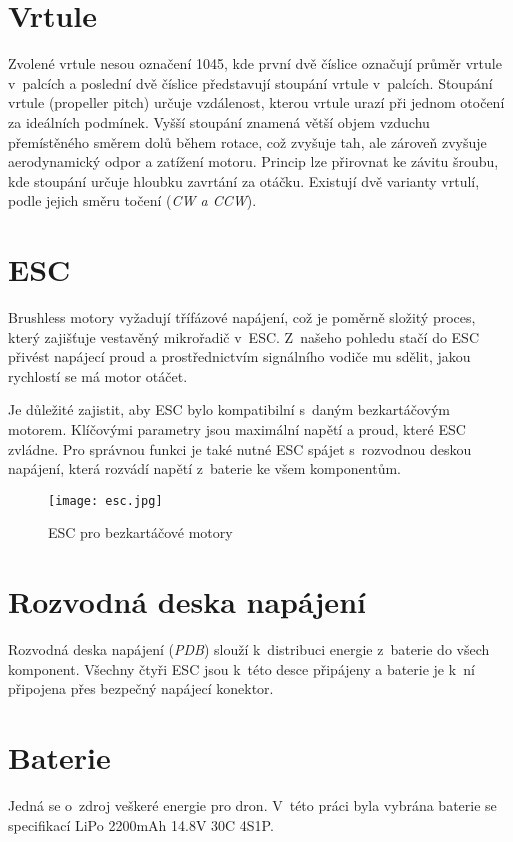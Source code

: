 \documentclass[12pt]{report}
\begin{document}
\section[Vrtule]{Vrtule}
Zvolené vrtule nesou označení 1045, kde první dvě číslice označují průměr vrtule v~palcích a poslední dvě číslice představují stoupání vrtule v~palcích. Stoupání vrtule (propeller pitch) určuje vzdálenost, kterou vrtule urazí při jednom otočení za ideálních podmínek. Vyšší stoupání znamená větší objem vzduchu přemístěného směrem dolů během rotace, což zvyšuje tah, ale zároveň zvyšuje aerodynamický odpor a zatížení motoru. Princip lze přirovnat ke závitu šroubu, kde stoupání určuje hloubku zavrtání za otáčku. Existují dvě varianty vrtulí, podle jejich směru točení (\textit{CW a CCW}).

\section[ESC]{ESC}
Brushless motory vyžadují třífázové napájení, což je poměrně složitý proces, který zajišťuje vestavěný mikrořadič v~ESC. Z~našeho pohledu stačí do ESC přivést napájecí proud a prostřednictvím signálního vodiče mu sdělit, jakou rychlostí se má motor otáčet.

Je důležité zajistit, aby ESC bylo kompatibilní s~daným bezkartáčovým motorem. Klíčovými parametry jsou maximální napětí a proud, které ESC zvládne. Pro správnou funkci je také nutné ESC spájet s~rozvodnou deskou napájení, která rozvádí napětí z~baterie ke všem komponentům.

\begin{figure}[H]
	\centering
	\texttt{[image: esc.jpg]}
	\caption{ESC pro bezkartáčové motory}
	\label{fig:esc.jpg}
\end{figure}

\section{Rozvodná deska napájení}
Rozvodná deska napájení (\textit{PDB}) slouží k~distribuci energie z~baterie do všech komponent. Všechny čtyři ESC jsou k~této desce připájeny a baterie je k~ní připojena přes bezpečný napájecí konektor.

\section[Baterie]{Baterie}
Jedná se o~zdroj veškeré energie pro dron. V~této práci byla vybrána baterie se specifikací LiPo 2200mAh 14.8V 30C 4S1P.
\end{document}

